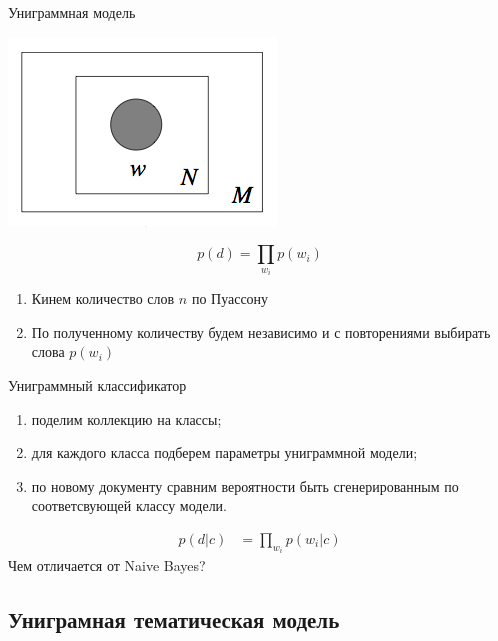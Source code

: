 \documentclass[14pt, fleqn, xcolor={dvipsnames, table}]{beamer}
\begin{document}
\begin{frame}{Униграммная модель}
\begin{center}
\includegraphics[height=0.3\textheight]{Unigram.png}
\end{center}
$$
p(d) = \prod_{w_i} p(w_i)
$$
\begin{enumerate}
  \item Кинем количество слов $n$ по Пуассону
  \item По полученному количеству будем независимо и с повторениями выбирать слова $p(w_i)$
\end{enumerate}
\end{frame}

\begin{frame}{Униграммный классификатор}
\begin{enumerate}
\footnotesize
  \item поделим коллекцию на классы;
  \item для каждого класса подберем параметры униграммной модели;
  \item по новому документу сравним вероятности быть сгенерированным по соответсвующей классу модели.
\end{enumerate}
$$\begin{array}{ll}
p(d|c) &= \prod_{w_i} p(w_i|c)
\end{array}$$
Чем отличается от Naive Bayes?
\end{frame}

\subsection{Униграмная тематическая модель}
\end{document}
